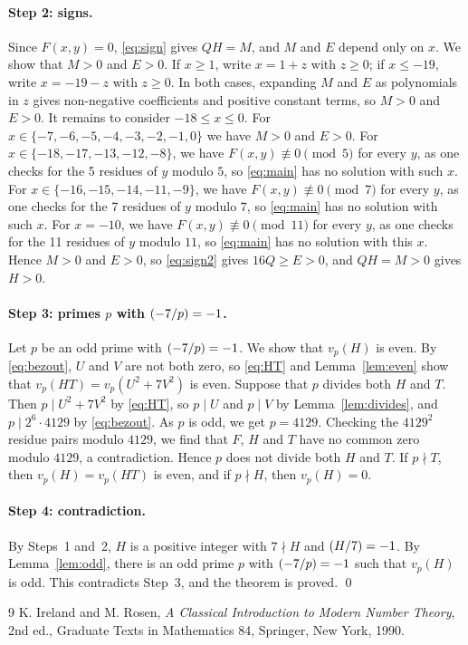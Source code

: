 \documentclass[11pt]{article}
\newcommand{\leg}[2]{\mathchoice{\biggl(\dfrac{#1}{#2}\biggr)}{(#1/#2)}{(#1/#2)}{(#1/#2)}}
\begin{document}
\paragraph{Step 2: signs.} Since $F(x,y)=0$, \eqref{eq:sign} gives $QH=M$, and $M$ and $E$ depend only on $x$. We show that $M>0$ and $E>0$. If $x\geq1$, write $x=1+z$ with $z\geq0$; if $x\leq-19$, write $x=-19-z$ with $z\geq0$. In both cases, expanding $M$ and $E$ as polynomials in $z$ gives non-negative coefficients and positive constant terms, so $M>0$ and $E>0$. It remains to consider $-18\leq x\leq0$. For $x\in\{-7,-6,-5,-4,-3,-2,-1,0\}$ we have $M>0$ and $E>0$. For $x\in\{-18,-17,-13,-12,-8\}$, we have $F(x,y)\not\equiv0\pmod{5}$ for every $y$, as one checks for the 5 residues of $y$ modulo $5$, so \eqref{eq:main} has no solution with such $x$. For $x\in\{-16,-15,-14,-11,-9\}$, we have $F(x,y)\not\equiv0\pmod{7}$ for every $y$, as one checks for the 7 residues of $y$ modulo $7$, so \eqref{eq:main} has no solution with such $x$. For $x=-10$, we have $F(x,y)\not\equiv0\pmod{11}$ for every $y$, as one checks for the 11 residues of $y$ modulo $11$, so \eqref{eq:main} has no solution with this $x$. Hence $M>0$ and $E>0$, so \eqref{eq:sign2} gives $16Q\geq E>0$, and $QH=M>0$ gives $H>0$.

\paragraph{\texorpdfstring{Step 3: primes $p$ with $\leg{-7}{p}=-1$.}{Step 3: inert primes.}} Let $p$ be an odd prime with $\leg{-7}{p}=-1$. We show that $v_p(H)$ is even. By \eqref{eq:bezout}, $U$ and $V$ are not both zero, so \eqref{eq:HT} and Lemma~\ref{lem:even} show that $v_p(HT)=v_p(U^2+7V^2)$ is even. Suppose that $p$ divides both $H$ and $T$. Then $p\mid U^2+7V^2$ by \eqref{eq:HT}, so $p\mid U$ and $p\mid V$ by Lemma~\ref{lem:divides}, and $p\mid 2^{6}\cdot 4129$ by \eqref{eq:bezout}. As $p$ is odd, we get $p=4129$. Checking the $4129^2$ residue pairs modulo $4129$, we find that $F$, $H$ and $T$ have no common zero modulo $4129$, a contradiction. Hence $p$ does not divide both $H$ and $T$. If $p\nmid T$, then $v_p(H)=v_p(HT)$ is even, and if $p\nmid H$, then $v_p(H)=0$.

\paragraph{Step 4: contradiction.} By Steps~1 and~2, $H$ is a positive integer with $7\nmid H$ and $\leg{H}{7}=-1$. By Lemma~\ref{lem:odd}, there is an odd prime $p$ with $\leg{-7}{p}=-1$ such that $v_p(H)$ is odd. This contradicts Step~3, and the theorem is proved.
\qed

\begin{thebibliography}{9}
 K. Ireland and M. Rosen, \emph{A Classical Introduction to Modern Number Theory}, 2nd ed., Graduate Texts in Mathematics 84, Springer, New York, 1990.
\end{thebibliography}
\end{document}
